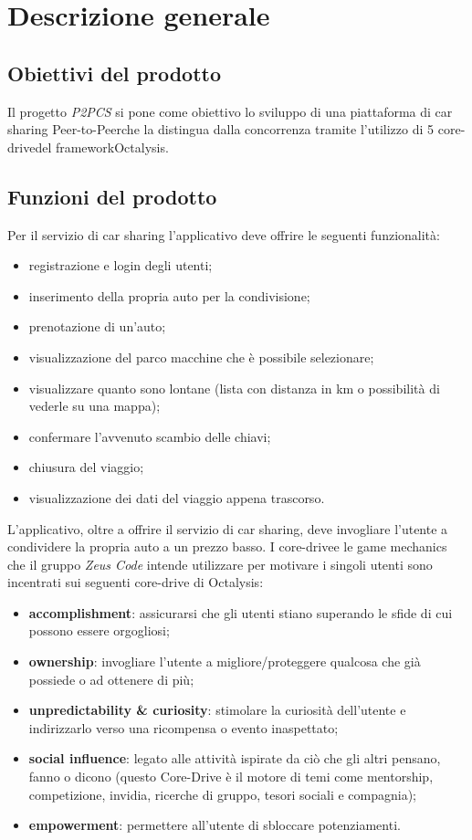\section{Descrizione generale} 
\subsection{Obiettivi del prodotto}
Il progetto \textit{P2PCS} si pone come obiettivo lo sviluppo di una piattaforma di car sharing Peer-to-Peer\glosp che la distingua dalla concorrenza tramite l'utilizzo di 5 core-drive\glosp del framework\glosp Octalysis\glo.

\subsection{Funzioni del prodotto}
Per il servizio di car sharing l'applicativo deve offrire le seguenti funzionalità:
\begin{itemize}
	\item registrazione e login degli utenti;
	\item inserimento della propria auto per la condivisione;
	\item prenotazione di un'auto;
	\item visualizzazione del parco macchine che è possibile selezionare;
	\item visualizzare quanto sono lontane (lista con distanza in km o possibilità di vederle su una mappa);
	\item confermare l’avvenuto scambio delle chiavi;
	\item chiusura del viaggio;
	\item visualizzazione dei dati del viaggio appena trascorso.
	\newline
\end{itemize}
L'applicativo, oltre a offrire il servizio di car sharing, deve invogliare l'utente a condividere la propria auto a un prezzo basso. 
I core-drive\glosp e le game mechanics che il gruppo \textit{Zeus Code} intende utilizzare per motivare i singoli utenti sono incentrati sui seguenti core-drive di Octalysis\glo: 
\begin{itemize}
	\item \textbf{accomplishment}: assicurarsi che gli utenti stiano superando le sfide di cui possono essere orgogliosi;
	\item \textbf{ownership}: invogliare l'utente a migliore/proteggere qualcosa che già possiede o ad ottenere di più;
	\item \textbf{unpredictability \& curiosity}: stimolare la curiosità dell'utente e indirizzarlo verso una ricompensa o evento inaspettato;
	\item \textbf{social influence}: legato alle attività ispirate da ciò che gli altri pensano, fanno o dicono (questo Core-Drive è il motore di temi come mentorship, competizione, invidia, ricerche di gruppo, tesori sociali e compagnia);
	\item \textbf{empowerment}: permettere all'utente di sbloccare potenziamenti.
\end{itemize}
